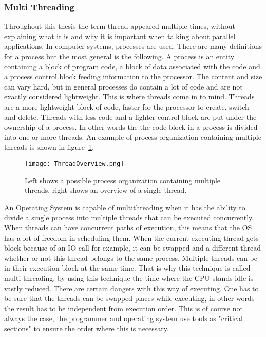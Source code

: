 \subsubsection{Multi Threading}
Throughout this thesis the term thread appeared multiple times, without explaining what it is and why it is important when talking about parallel applications.
In computer systems, processes are used.
There are many definitions for a process but the most general is the following. 
A process is an entity containing a block of program code, a block of data associated with the code and a process control block feeding information to the processor.\cite{stallings2015operating}
The content and size can vary hard, but in general processes do contain a lot of code and are not exactly considered lightweight. 
This is where threads come in to mind. 
Threads are a more lightweight block of code, faster for the processor to create, switch and delete.
Threads with less code and a lighter control block are put under the ownership of a process.
In other words the the code block in a process is divided into one or more threads.
An example of process organization containing multiple threads is shown in figure~\ref{fig:threadOverview}.
\begin{figure}
	\centering
	\texttt{[image: ThreadOverview.png]}
	\caption{Left shows a possible process organization containing multiple threads, right shows an overview of a single thread.}
	\label{fig:threadOverview}
\end{figure}
\par 
An Operating System is capable of multithreading when it has the ability to divide a single process into multiple threads that can be executed concurrently.
When threads can have concurrent paths of execution, this means that the OS has a lot of freedom in scheduling them.
When the current executing thread gets block because of an IO call for example, it can be swapped and a different thread whether or not this thread belongs to the same process.
Multiple threads can be in their execution block at the same time.
That is why this technique is called multi threading, by using this technique the time where the CPU stands idle is vastly reduced.
There are certain dangers with this way of executing. 
One has to be sure that the threads can be swapped places while executing, in other words the result has to be independent from execution order.
This is of course not always the case, the programmer and operating system use tools as "critical sections" to ensure the order where this is necessary.
